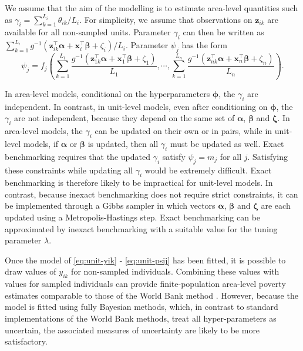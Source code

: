 \documentclass[12pt]{article}
\begin{document}
We assume that the aim of the modelling is to estimate area-level quantities such as $\gamma_i = \sum_{k=1}^{L_i} \theta_{ik}  / L_i$.  For simplicity, we assume that observations on $\bm{z}_{ik}$ are available for all non-sampled units.  Parameter $\gamma_i$ can then be written as $\sum_{k=1}^{L_i} g^{-1}(\bm{z}_{ik}^{\top}\bm{\alpha} + \bm{x}_i^{\top} \bm{\beta}+\zeta_i)/L_i$.  Parameter $\psi_j$ has the form
\begin{equation}
  \psi_j =  f_j\left( \sum_{k=1}^{L_1} \frac{ g^{-1}(\bm{z}_{1k}^{\top}\bm{\alpha} + \bm{x}_1^{\top} \bm{\beta}+\zeta_1) }{ L_1 },\cdots,
   \sum_{k=1}^{L_n} \frac{ g^{-1}(\bm{z}_{nk}^{\top}\bm{\alpha} + \bm{x}_n^{\top} \bm{\beta}+\zeta_n) }{ L_n }   \right).\label{eq:unit-psij}
\end{equation}

In area-level models, conditional on the hyperparameters $\bm{\phi}$, the $\gamma_i$ are independent.  In contrast, in unit-level models, even after conditioning on $\bm{\phi}$, the $\gamma_i$ are not independent, because they depend on the same set of  $\bm{\alpha}$, $\bm{\beta}$ and $\bm{\zeta}$.  In area-level models, the $\gamma_i$ can be updated on their own or in pairs, while in unit-level models, if $\bm{\alpha}$ or $\bm{\beta}$ is updated, then all $\gamma_i$ must be updated as well.  Exact benchmarking requires that the updated $\gamma_i$ satisfy $\psi_j = m_j$ for all $j$.  Satisfying these constraints while updating all $\gamma_i$ would be extremely difficult.  Exact benchmarking is therefore likely to be impractical for unit-level models.  In contrast, because inexact benchmarking does not require strict constraints, it can be implemented through a Gibbs sampler in which vectors $\bm{\alpha}$, $\bm{\beta}$ and $\bm{\zeta}$ are each updated using a Metropolis-Hastings step.  Exact benchmarking can be approximated by inexact benchmarking with a suitable value for the tuning parameter $\lambda$.

Once the model of \eqref{eq:unit-yik} - \eqref{eq:unit-psij} has been fitted, it is possible to draw values of $y_{ik}$ for non-sampled individuals.  Combining these values with values for sampled individuals can provide finite-population area-level poverty estimates comparable to those of the World Bank method \citep{elbers2003micro}. However, because the model is fitted using fully Bayesian methods, which, in contrast to standard implementations of the World Bank methods, treat all hyper-parameters as uncertain, the associated measures of uncertainty are likely to be more satisfactory.



\end{document}
